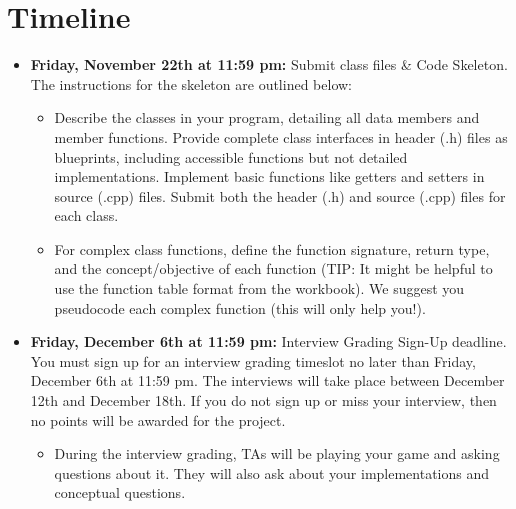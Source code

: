 \section{Timeline}

\begin{itemize}
    \item  \textbf{Friday, November 22th at 11:59 pm:} Submit class files \& Code Skeleton. The instructions for the skeleton are outlined below:
    \begin{itemize}
    \item  Describe the classes in your program, detailing all data members and member functions. Provide complete class interfaces in header (.h) files as blueprints, including accessible functions but not detailed implementations. Implement basic functions like getters and setters in source (.cpp) files. Submit both the header (.h) and source (.cpp) files for each class. 
        \item For complex class functions, define the function signature, return type, and the concept/objective of each function (TIP: It might be helpful to use the function table format from the workbook). We suggest you pseudocode each complex function (this will only help you!).
    \end{itemize}

    \item \textbf{Friday, December 6th at 11:59 pm:} Interview Grading Sign-Up deadline. You must sign up for an interview grading timeslot no later than Friday, December 6th at 11:59 pm. The interviews will take place between December 12th and December 18th. If you do not sign up or miss your interview, then no points will be awarded for the project.
    \begin{itemize}
        \item During the interview grading, TAs will be playing your game and asking questions about it. They will also ask about your implementations and conceptual questions.

    \end{itemize}


\end{itemize}

